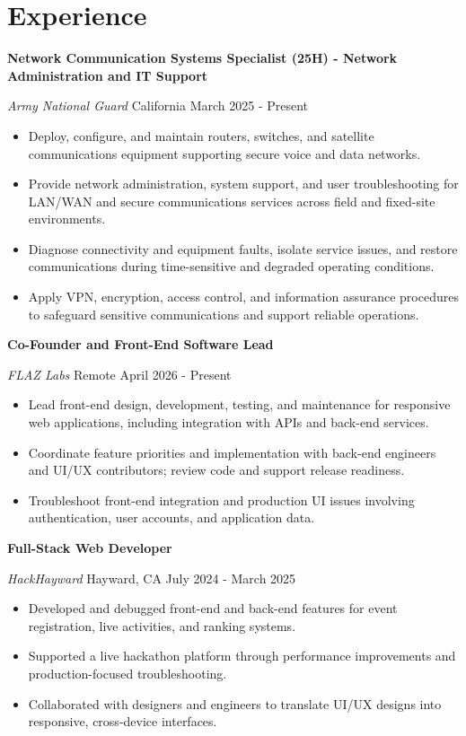 \documentclass[letterpaper,10pt]{article}
\newcommand{\resumeEntry}[4]{%
  \textbf{#1}\par
  {\small\textit{#3} \textbar{} #4 \textbar{} #2}\par\vspace{-1pt}%
}
\begin{document}
\section{Experience}

\resumeEntry
  {Network Communication Systems Specialist (25H) - Network Administration and IT Support}
  {March 2025 - Present}
  {Army National Guard}
  {California}
\begin{itemize}
  \item Deploy, configure, and maintain routers, switches, and satellite communications equipment supporting secure voice and data networks.
  \item Provide network administration, system support, and user troubleshooting for LAN/WAN and secure communications services across field and fixed-site environments.
  \item Diagnose connectivity and equipment faults, isolate service issues, and restore communications during time-sensitive and degraded operating conditions.
  \item Apply VPN, encryption, access control, and information assurance procedures to safeguard sensitive communications and support reliable operations.
\end{itemize}

\resumeEntry
  {Co-Founder and Front-End Software Lead}
  {April 2026 - Present}
  {FLAZ Labs}
  {Remote}
\begin{itemize}
  \item Lead front-end design, development, testing, and maintenance for responsive web applications, including integration with APIs and back-end services.
  \item Coordinate feature priorities and implementation with back-end engineers and UI/UX contributors; review code and support release readiness.
  \item Troubleshoot front-end integration and production UI issues involving authentication, user accounts, and application data.
\end{itemize}

\resumeEntry
  {Full-Stack Web Developer}
  {July 2024 - March 2025}
  {HackHayward}
  {Hayward, CA}
\begin{itemize}
  \item Developed and debugged front-end and back-end features for event registration, live activities, and ranking systems.
  \item Supported a live hackathon platform through performance improvements and production-focused troubleshooting.
  \item Collaborated with designers and engineers to translate UI/UX designs into responsive, cross-device interfaces.
\end{itemize}
\end{document}
